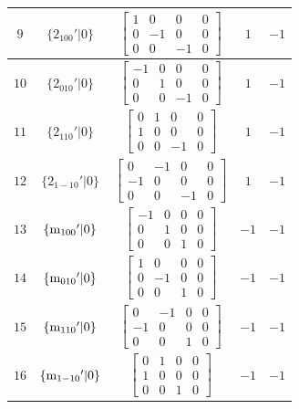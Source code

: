 \documentclass[fleqn,8pt]{jsarticle}
\begin{document}
\begin{longtable}{ccccc}
$ 9 $ & $ \{2{}_{100}{}'|0\} $ & $ \begin{bmatrix} 1 & 0 & 0 & 0 \\ 0 & -1 & 0 & 0 \\ 0 & 0 & -1 & 0 \end{bmatrix} $ & $ 1 $ & $ -1 $ \\ \hline
$ 10 $ & $ \{2{}_{010}{}'|0\} $ & $ \begin{bmatrix} -1 & 0 & 0 & 0 \\ 0 & 1 & 0 & 0 \\ 0 & 0 & -1 & 0 \end{bmatrix} $ & $ 1 $ & $ -1 $ \\ \hline
$ 11 $ & $ \{2{}_{110}{}'|0\} $ & $ \begin{bmatrix} 0 & 1 & 0 & 0 \\ 1 & 0 & 0 & 0 \\ 0 & 0 & -1 & 0 \end{bmatrix} $ & $ 1 $ & $ -1 $ \\ \hline
$ 12 $ & $ \{2{}_{1-10}{}'|0\} $ & $ \begin{bmatrix} 0 & -1 & 0 & 0 \\ -1 & 0 & 0 & 0 \\ 0 & 0 & -1 & 0 \end{bmatrix} $ & $ 1 $ & $ -1 $ \\ \hline
$ 13 $ & $ \{{\rm m}_{100}{}'|0\} $ & $ \begin{bmatrix} -1 & 0 & 0 & 0 \\ 0 & 1 & 0 & 0 \\ 0 & 0 & 1 & 0 \end{bmatrix} $ & $ -1 $ & $ -1 $ \\ \hline
$ 14 $ & $ \{{\rm m}_{010}{}'|0\} $ & $ \begin{bmatrix} 1 & 0 & 0 & 0 \\ 0 & -1 & 0 & 0 \\ 0 & 0 & 1 & 0 \end{bmatrix} $ & $ -1 $ & $ -1 $ \\ \hline
$ 15 $ & $ \{{\rm m}_{110}{}'|0\} $ & $ \begin{bmatrix} 0 & -1 & 0 & 0 \\ -1 & 0 & 0 & 0 \\ 0 & 0 & 1 & 0 \end{bmatrix} $ & $ -1 $ & $ -1 $ \\ \hline
$ 16 $ & $ \{{\rm m}_{1-10}{}'|0\} $ & $ \begin{bmatrix} 0 & 1 & 0 & 0 \\ 1 & 0 & 0 & 0 \\ 0 & 0 & 1 & 0 \end{bmatrix} $ & $ -1 $ & $ -1 $ \\ \hline

\end{longtable}
\end{document}
